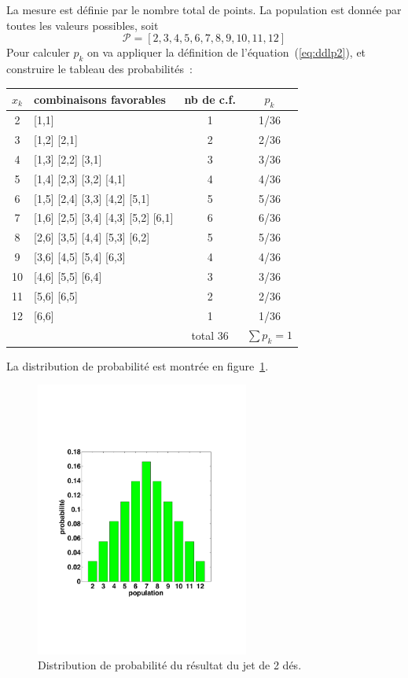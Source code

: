 La mesure est définie par le nombre total de points. La population est donnée par toutes les valeurs possibles, soit
$$
\mathcal{P}=[2,3,4,5,6,7,8,9,10,11,12]
$$
Pour calculer $p_k$ on va appliquer la définition de l'équation~(\ref{eq:ddlp2}), et construire le tableau des probabilités~:
\begin{center}
\begin{tabular}{clcc}
$x_k$ & combinaisons favorables & nb de c.f. & $p_k$ \\\hline
 2 & [1,1] & 1 & 1/36 \\
 3 & [1,2] [2,1] & 2 & 2/36\\
 4 & [1,3] [2,2] [3,1] & 3 & 3/36 \\
 5 & [1,4] [2,3] [3,2] [4,1] & 4 & 4/36 \\
 6 & [1,5] [2,4] [3,3] [4,2] [5,1] & 5 & 5/36 \\
 7 & [1,6] [2,5] [3,4] [4,3] [5,2] [6,1] & 6 & 6/36 \\
 8 & [2,6] [3,5] [4,4] [5,3] [6,2] & 5 & 5/36 \\
 9 & [3,6] [4,5] [5,4] [6,3] & 4 & 4/36 \\
10 & [4,6] [5,5] [6,4] & 3 & 3/36 \\
11 & [5,6] [6,5] & 2 & 2/36 \\
12 & [6,6] & 1 & 1/36 \\\hline
 & & total 36 & $\sum p_k=1$
\end{tabular}
\end{center}
La distribution de probabilité est montrée en figure~\ref{fig:ddjddd}.
\begin{figure}[h]
   \centering
   \includegraphics[width=7cm]{assets/figures/Serie2_exe01fig1.pdf}
   \caption{Distribution de probabilité du résultat du jet de 2 dés.}
   \label{fig:ddjddd}
\end{figure}

